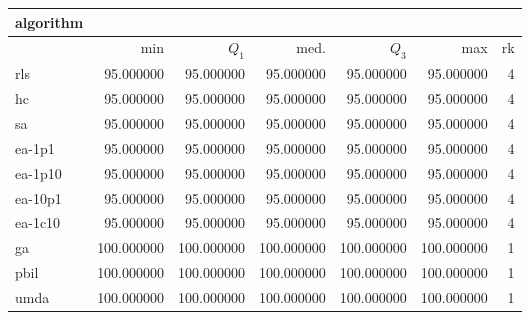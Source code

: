 \begin{tabular}{@{}l*{5}{>{{}}N{3}{0}}>{{}}N{2}{0}@{}}
\toprule
{algorithm} &  \\
\midrule
& {min} & {$Q_1$} & {med.} & {$Q_3$} & {max} & {rk}\\
\midrule
rls & 95.000000 & 95.000000 & 95.000000 & 95.000000 & 95.000000 & 4\\
hc & 95.000000 & 95.000000 & 95.000000 & 95.000000 & 95.000000 & 4\\
sa & 95.000000 & 95.000000 & 95.000000 & 95.000000 & 95.000000 & 4\\
ea-1p1 & 95.000000 & 95.000000 & 95.000000 & 95.000000 & 95.000000 & 4\\
ea-1p10 & 95.000000 & 95.000000 & 95.000000 & 95.000000 & 95.000000 & 4\\
ea-10p1 & 95.000000 & 95.000000 & 95.000000 & 95.000000 & 95.000000 & 4\\
ea-1c10 & 95.000000 & 95.000000 & 95.000000 & 95.000000 & 95.000000 & 4\\
ga & {\color{blue}} 100.000000 & {\color{blue}} 100.000000 & {\color{blue}} 100.000000 & {\color{blue}} 100.000000 & {\color{blue}} 100.000000 & 1\\
pbil & {\color{blue}} 100.000000 & {\color{blue}} 100.000000 & {\color{blue}} 100.000000 & {\color{blue}} 100.000000 & {\color{blue}} 100.000000 & 1\\
umda & {\color{blue}} 100.000000 & {\color{blue}} 100.000000 & {\color{blue}} 100.000000 & {\color{blue}} 100.000000 & {\color{blue}} 100.000000 & 1\\
\bottomrule
\end{tabular}
